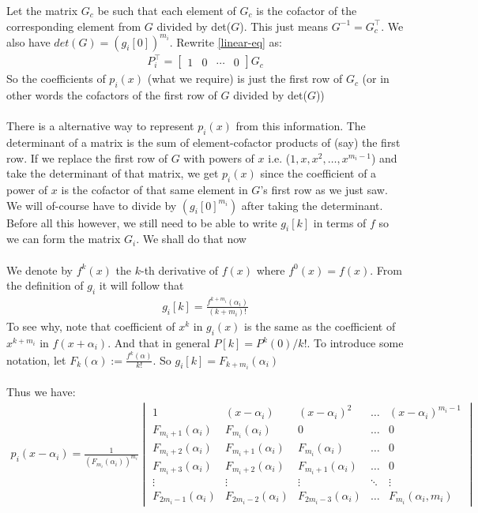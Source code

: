 \documentclass{article}
\begin{document}
Let the matrix $G_c$ be such that each element of $G_c$ is the cofactor of the corresponding element from $G$ divided by det($G$). This just means $G^{-1} = G_c^\top $. We also have $det(G) = (g_i[0])^{m_i}$. Rewrite \eqref{linear-eq} as:
\begin{align}
    P_i^{\top} = \begin{bmatrix}1 & 0 & \cdots & 0\end{bmatrix} G_c
\end{align}
So the coefficients of $p_i(x)$ (what we require) is just the first row of $G_c$ (or in other words the cofactors of the first row of $G$ divided by det($G$)) 
\\\\
There is a alternative way to represent $p_i(x)$ from this information. The determinant of a matrix is the sum of element-cofactor products of (say) the first row. If we replace the first row of $G$ with powers of $x$ i.e. ($1,x,x^2,\dots,x^{m_i-1}$) and take the determinant of that matrix, we get $p_i(x)$ since the coefficient of a power of $x$ is the cofactor of that same element in $G$'s first row as we just saw. We will of-course have to divide by $(g_i[0]^{m_i})$ after taking the determinant. Before all this however, we still need to be able to write $g_i[k]$ in terms of $f$ so we can form the matrix $G_i$. We shall do that now
\\\\
We denote by $f^k(x)$ the $k$-th derivative of $f(x)$ where $f^0(x) = f(x)$. From the definition of $g_i$ it will follow that
\begin{align}
    g_i[k] = \frac{f^{k+m_i}(\alpha_i)}{(k+m_i)!}
\end{align}
To see why, note that coefficient of $x^k$ in $g_i(x)$ is the same as the coefficient of $x^{k+m_i}$ in $f(x+\alpha_i)$. And that in general $P[k] = P^k(0)/k!$. To introduce some notation, let $F_k(\alpha) := \frac{f^k(\alpha)}{k!}$. So $g_i[k] = F_{k+m_i}(\alpha_i)$
\\\\
Thus we have:
\begin{align}
    p_i(x-\alpha_i) = \frac{1}{(F_{m_i}(\alpha_i))^{m_i}}\begin{vmatrix}
    1 & (x-\alpha_i) & (x-\alpha_i)^2 &  \dots  & (x-\alpha_i)^{m_i-1} \\
    F_{m_i+1}(\alpha_i) & F_{m_i}(\alpha_i) & 0 &\dots  & 0 \\
    F_{m_i+2}(\alpha_i) & F_{m_i+1}(\alpha_i) & F_{m_i}(\alpha_i) & \dots  & 0 \\
    F_{m_i+3}(\alpha_i) & F_{m_i+2}(\alpha_i) & F_{m_i+1}(\alpha_i)  & \dots  & 0 \\
    \vdots & \vdots & \vdots & \ddots & \vdots \\
    F_{2m_i-1}(\alpha_i) & F_{2m_i-2}(\alpha_i) & F_{2m_i-3}(\alpha_i) & \dots  & F_{m_i}(\alpha_i, m_i)
\end{vmatrix}
\end{align}
\end{document}
